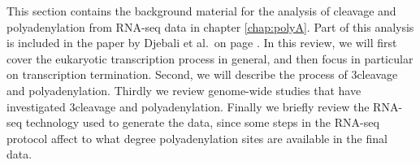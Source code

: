 %
This section contains the background material for the analysis of cleavage and
polyadenylation from RNA-seq data in chapter \ref{chap:polyA}. Part of this
analysis is included in the paper by Djebali et al.\ on page
\pageref{landscape}. In this review, we will first cover the eukaryotic
transcription process in general, and then focus in particular on transcription
termination. Second, we will describe the process of 3\ppp cleavage and
polyadenylation. Thirdly we review genome-wide studies that have investigated
3\ppp cleavage and polyadenylation. Finally we briefly review the RNA-seq
technology used to generate the data, since some steps in the RNA-seq protocol
affect to what degree polyadenylation sites are available in the final data.

